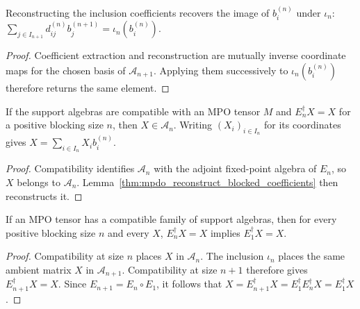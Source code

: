 \begin{lemma}%
    \label{thm:mpdo_inclusion_coefficients_reconstruct}
    \leanok
    Reconstructing the inclusion coefficients recovers the image of
    $b_i^{(n)}$ under $\iota_n$:
    $\sum_{j \in I_{n+1}} d^{(n)}_{ij} b_j^{(n+1)}
        = \iota_n(b_i^{(n)})$.
\end{lemma}
\begin{proof}\leanok
    Coefficient extraction and reconstruction are mutually inverse coordinate
    maps for the chosen basis of $\mathcal{A}_{n+1}$. Applying them successively
    to $\iota_n(b_i^{(n)})$ therefore returns the same element.
\end{proof}

\begin{lemma}%
    \label{thm:mpdo_fixedpoint_coefficients_reconstruct}
    \leanok
    If the support algebras are compatible with an MPO tensor $M$ and
    $E_n^\dagger X = X$ for a positive blocking size $n$, then
    $X \in \mathcal{A}_n$. Writing $(X_i)_{i \in I_n}$ for its coordinates
    gives $X = \sum_{i \in I_n} X_i b_i^{(n)}$.
\end{lemma}
\begin{proof}\leanok
    Compatibility identifies $\mathcal{A}_n$ with the adjoint fixed-point algebra of
    $E_n$, so $X$ belongs to $\mathcal{A}_n$.
    Lemma~\ref{thm:mpdo_reconstruct_blocked_coefficients} then reconstructs it.
\end{proof}

\begin{lemma}%
    \label{thm:mpdo_adjoint_fix_descent}
    \leanok
    If an MPO tensor has a compatible family of support algebras, then for
    every positive blocking size $n$ and every $X$,
    $E_n^{\dagger}X=X$ implies $E_1^{\dagger}X=X$.
\end{lemma}
\begin{proof}\leanok
    Compatibility at size $n$ places $X$ in $\mathcal{A}_n$. The inclusion
    $\iota_n$ places the same ambient matrix $X$ in $\mathcal{A}_{n+1}$.
    Compatibility at size $n+1$ therefore gives $E_{n+1}^\dagger X=X$.
    Since $E_{n+1}=E_n\circ E_1$, it follows that
    $X=E_{n+1}^\dagger X=E_1^\dagger E_n^\dagger X=E_1^\dagger X$.
\end{proof}

